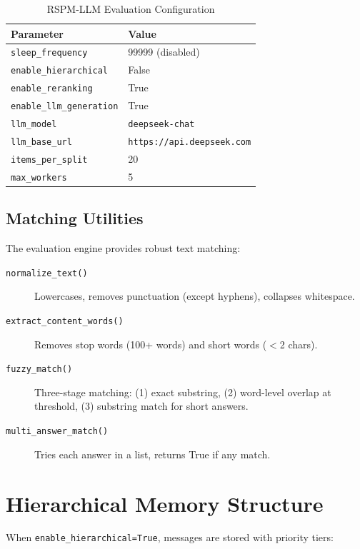 \documentclass[11pt,a4paper]{article}
\begin{document}
\begin{table}[H]
\centering
\caption{RSPM-LLM Evaluation Configuration}
\begin{tabular}{@{}ll@{}}
\toprule
\textbf{Parameter} & \textbf{Value} \\
\midrule
\texttt{sleep\_frequency} & 99999 (disabled) \\
\texttt{enable\_hierarchical} & False \\
\texttt{enable\_reranking} & True \\
\texttt{enable\_llm\_generation} & True \\
\texttt{llm\_model} & \texttt{deepseek-chat} \\
\texttt{llm\_base\_url} & \texttt{https://api.deepseek.com} \\
\texttt{items\_per\_split} & 20 \\
\texttt{max\_workers} & 5 \\
\bottomrule
\end{tabular}
\end{table}

\subsection{Matching Utilities}

The evaluation engine provides robust text matching:

\begin{description}
    \item[\texttt{normalize\_text()}] Lowercases, removes punctuation (except hyphens), collapses whitespace.
    \item[\texttt{extract\_content\_words()}] Removes stop words (100+ words) and short words ($<$2 chars).
    \item[\texttt{fuzzy\_match()}] Three-stage matching: (1) exact substring, (2) word-level overlap at threshold, (3) substring match for short answers.
    \item[\texttt{multi\_answer\_match()}] Tries each answer in a list, returns True if any match.
\end{description}

\section{Hierarchical Memory Structure}

When \texttt{enable\_hierarchical=True}, messages are stored with priority tiers:
\end{document}
